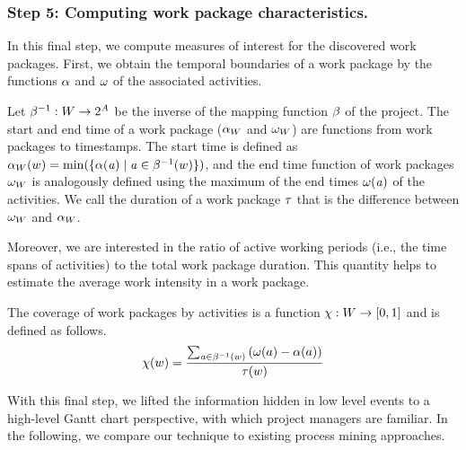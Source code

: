 \subsubsection*{Step 5: Computing work package characteristics.} In this final step, we compute measures of interest for the discovered work packages. First, we obtain the temporal boundaries of a work package by the functions $\alpha$ and $\omega$ of the associated activities.

Let $\beta^{-1} : W \rightarrow 2^{\mathit{A}}$ be the inverse of the mapping function $\beta$ of the project.
The start and end time of a work package ($\alpha_{W}$ and $\omega_{W}$) are functions from work packages to timestamps. The start time is defined as $\alpha_{W}(w) = \min(\lbrace \alpha(\mathit{a}) \mid \mathit{a} \in \beta^{-1}(w)\rbrace )$, and the end time function of work packages $\omega_{W}$ is analogously defined using the maximum of the end times $\omega(\mathit{a})$ of the activities.
We call the duration of a work package $\tau$ that is the difference between $\omega_{W}$ and $\alpha_{W}$.

Moreover, we are interested in the ratio of active working periods (i.e., the time spans of activities) to the total work package duration. This quantity helps to estimate the average work intensity in a work package.

\begin{definition}[Coverage]
The coverage \coverage of work packages by activities is a function $\chi : W \rightarrow [0,1]$ and is defined as follows.
\begin{equation}
\chi(w) = \frac{\sum_{\mathit{a} \in \beta^{-1}(w)}  \left(\omega(a) - \alpha(a)\right)}{\tau(w)}
\end{equation}

\end{definition}

With this final step, we lifted the information hidden in low level events to a high-level Gantt chart perspective, with which project managers are familiar. In the following, we compare our technique to existing process mining approaches.



